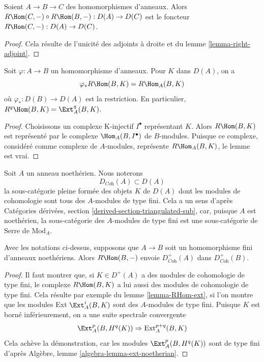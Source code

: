 \begin{lemma}
\label{lemma-composition-right-adjoints}
Soient $A \to B \to C$ des homomorphismes d'anneaux. Alors
$R\Hom(C, -) \circ R\Hom(B, -) : D(A) \to D(C)$
est le foncteur $R\Hom(C, -) : D(A) \to D(C)$.
\end{lemma}

\begin{proof}
Cela résulte de l'unicité des adjoints à droite et du lemme \ref{lemma-right-adjoint}.
\end{proof}

\begin{lemma}
\label{lemma-RHom-ext}
Soit $\varphi : A \to B$ un homomorphisme d'anneaux. Pour $K$ dans $D(A)$, on a
$$
\varphi_*R\Hom(B, K) = R\Hom_A(B, K)
$$
où $\varphi_* : D(B) \to D(A)$ est la restriction. En particulier,
$R^q\Hom(B, K) = \Ext_A^q(B, K)$.
\end{lemma}

\begin{proof}
Choisissons un complexe K-injectif $I^\bullet$ représentant $K$.
Alors $R\Hom(B, K)$ est représenté par le complexe $\Hom_A(B, I^\bullet)$ de $B$-modules.
Puisque ce complexe, considéré comme complexe de $A$-modules,
représente $R\Hom_A(B, K)$, le lemme est vrai.
\end{proof}

\noindent
Soit $A$ un anneau noethérien. Nous noterons
$$
D_{\textit{Coh}}(A) \subset D(A)
$$
la sous-catégorie pleine formée des objets $K$ de $D(A)$
dont les modules de cohomologie sont tous des $A$-modules de type fini.
Cela a un sens d'après Catégories dérivées, section \ref{derived-section-triangulated-sub},
car, puisque $A$ est noethérien, la sous-catégorie des
$A$-modules de type fini est une sous-catégorie de Serre de $\text{Mod}_A$.

\begin{lemma}
\label{lemma-exact-support-coherent}
Avec les notations ci-dessus, supposons que $A \to B$ soit un homomorphisme
fini d'anneaux noethériens. Alors $R\Hom(B, -)$ envoie $D^+_{\textit{Coh}}(A)$ dans $D^+_{\textit{Coh}}(B)$.
\end{lemma}

\begin{proof}
Il faut montrer que, si $K \in D^+(A)$ a des modules de cohomologie de type fini,
le complexe $R\Hom(B, K)$ a lui aussi des modules de cohomologie de type fini.
Cela résulte par exemple du lemme \ref{lemma-RHom-ext}, si l'on montre que
les modules Ext $\Ext^i_A(B, K)$ sont des $A$-modules de type fini.
Puisque $K$ est borné inférieurement, on a une suite spectrale convergente
$$
\Ext^p_A(B, H^q(K)) \Rightarrow \text{Ext}^{p + q}_A(B, K)
$$
Cela achève la démonstration, car les modules $\Ext^p_A(B, H^q(K))$
sont de type fini d'après Algèbre, lemme \ref{algebra-lemma-ext-noetherian}.
\end{proof}

